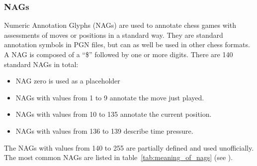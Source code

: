 \documentclass[article,type=msc,colorback,accentcolor=tud7b]{tudthesis}
\begin{document}
  \subsubsection{NAGs}
  \label{subsec:nags}
    Numeric Annotation Glyphs (NAGs) are used to annotate chess games with assessments of moves or positions in a standard way. They are standard annotation symbols in PGN files, but can as well be used in other chess formats. A NAG is composed of a “\$” followed by one or more digits. There are 140 standard NAGs in total:
    \begin{itemize}[noitemsep]
      \item NAG zero is used as a placeholder
      \item NAGs with values from 1 to 9 annotate the move just played.
      \item NAGs with values from 10 to 135 annotate the current position.
      \item NAGs with values from 136 to 139 describe time pressure.
    \end{itemize}
    The NAGs with values from 140 to 255 are partially defined and used unofficially. The most common NAGs are listed in table~\ref{tab:meaning_of_nags} (see \autocite[Section~10]{Edwards1994}).
	
\end{document}
